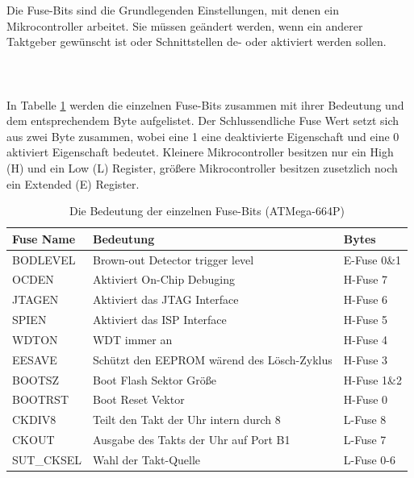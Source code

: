 Die Fuse-Bits sind die Grundlegenden Einstellungen, mit denen ein
Mikrocontroller arbeitet. Sie müssen geändert werden, wenn ein anderer Taktgeber
gewünscht ist oder Schnittstellen de- oder aktiviert werden sollen.\\
\\
\\
\\
In Tabelle \ref{fuses-names} werden die einzelnen Fuse-Bits zusammen mit ihrer
Bedeutung und dem entsprechendem Byte aufgelistet. Der Schlussendliche Fuse Wert
setzt sich aus zwei Byte zusammen, wobei eine 1 eine deaktivierte Eigenschaft und
eine 0 aktiviert Eigenschaft bedeutet. Kleinere Mikrocontroller besitzen nur ein
High (H) und ein Low (L) Register, größere Mikrocontroller besitzen zusetzlich
noch ein Extended (E) Register.

\begin{table} [H]
\begin{tabular}{|l|l|l|} \hline
Fuse Name & Bedeutung & Bytes\\ \hline
BODLEVEL & Brown-out Detector trigger level & E-Fuse 0\&1\\ \hline
OCDEN & Aktiviert On-Chip Debuging & H-Fuse 7\\ \hline
JTAGEN & Aktiviert das \ac{JTAG} Interface & H-Fuse 6\\ \hline
SPIEN & Aktiviert das \ac{ISP} Interface & H-Fuse 5\\ \hline
WDTON & \ac{WDT} immer an & H-Fuse 4\\ \hline
EESAVE & Schützt den \acs{EEPROM} wärend des Lösch-Zyklus & H-Fuse 3\\ \hline
BOOTSZ & Boot Flash Sektor Größe & H-Fuse 1\&2\\ \hline
BOOTRST & Boot Reset Vektor & H-Fuse 0\\ \hline
CKDIV8 & Teilt den Takt der Uhr intern durch 8 & L-Fuse 8\\ \hline
CKOUT & Ausgabe des Takts der Uhr auf Port B1 & L-Fuse 7\\ \hline
SUT\_CKSEL & Wahl der Takt-Quelle & L-Fuse 0-6\\ \hline
\end{tabular}
\caption{Die Bedeutung der einzelnen Fuse-Bits (ATMega-664P)}
\label{fuses-names}
\end{table}

